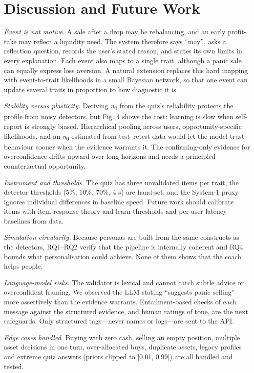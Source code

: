 \documentclass[conference]{IEEEtran}
\begin{document}
\section{Discussion and Future Work}
\textit{Event is not motive.} A sale after a drop may be rebalancing, and an early profit-take may reflect a liquidity need. The system therefore says ``may'', asks a reflection question, records the user's stated reason, and states its own limits in every explanation. Each event also maps to a single trait, although a panic sale can equally express loss aversion. A natural extension replaces this hard mapping with event-to-trait likelihoods in a small Bayesian network, so that one event can update several traits in proportion to how diagnostic it is.

\textit{Stability versus plasticity.} Deriving \textit{n}\textsubscript{0} from the quiz's reliability protects the profile from noisy detectors, but Fig. 4 shows the cost: learning is slow when self-report is strongly biased. Hierarchical pooling across users, opportunity-specific likelihoods, and an \textit{n}\textsubscript{0} estimated from test--retest data would let the model trust behaviour sooner when the evidence warrants it. The confirming-only evidence for overconfidence drifts upward over long horizons and needs a principled counterfactual opportunity.

\textit{Instrument and thresholds.} The quiz has three unvalidated items per trait, the detector thresholds (5\%, 10\%, 70\%, 4 s) are hand-set, and the System-1 proxy ignores individual differences in baseline speed. Future work should calibrate items with item-response theory and learn thresholds and per-user latency baselines from data.

\textit{Simulation circularity.} Because personas are built from the same constructs as the detectors, RQ1--RQ2 verify that the pipeline is internally coherent and RQ4 bounds what personalisation could achieve. None of them shows that the coach helps people.

\textit{Language-model risks.} The validator is lexical and cannot catch subtle advice or overconfident framing. We observed the LLM stating ``suggests panic selling'' more assertively than the evidence warrants. Entailment-based checks of each message against the structured evidence, and human ratings of tone, are the next safeguards. Only structured tags---never names or logs---are sent to the API.

\textit{Edge cases handled.} Buying with zero cash, selling an empty position, multiple asset decisions in one turn, over-allocated buys, duplicate assets, legacy profiles and extreme quiz answers (priors clipped to [0.01, 0.99]) are all handled and tested.
\end{document}
